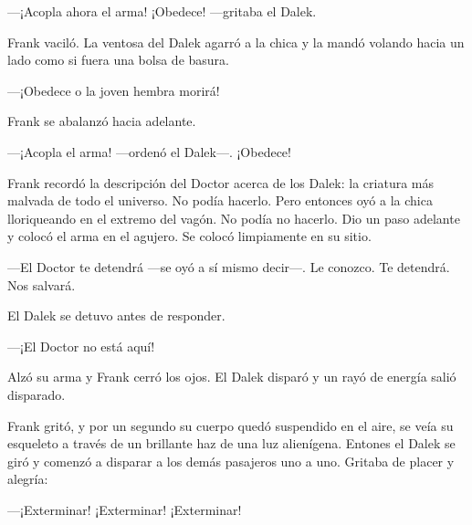 ---¡Acopla ahora el arma! ¡Obedece! ---gritaba el Dalek.

Frank vaciló. La ventosa del Dalek agarró a la chica y la mandó volando
hacia un lado como si fuera una bolsa de basura.

---¡Obedece o la joven hembra morirá!

Frank se abalanzó hacia adelante.

---¡Acopla el arma! ---ordenó el Dalek---. ¡Obedece!

Frank recordó la descripción del Doctor acerca de los Dalek: la criatura
más malvada de todo el universo. No podía hacerlo. Pero entonces oyó a
la chica lloriqueando en el extremo del vagón. No podía no hacerlo. Dio
un paso adelante y colocó el arma en el agujero. Se colocó limpiamente
en su sitio.

---El Doctor te detendrá ---se oyó a sí mismo decir---. Le conozco. Te
detendrá. Nos salvará.

El Dalek se detuvo antes de responder.

---¡El Doctor no está aquí!

Alzó su arma y Frank cerró los ojos. El Dalek disparó y un rayó de
energía salió disparado.

Frank gritó, y por un segundo su cuerpo quedó suspendido en el aire, se
veía su esqueleto a través de un brillante haz de una luz alienígena.
Entones el Dalek se giró y comenzó a disparar a los demás pasajeros uno
a uno. Gritaba de placer y alegría:

---¡Exterminar! ¡Exterminar! ¡Exterminar!